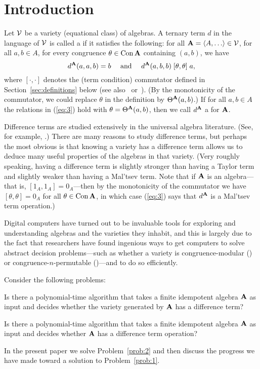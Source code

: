 

\section{Introduction}
\label{sec:introduction}
Let $\mathcal{V}$ be a variety (equational class) of algebras.
A ternary term $d$ in the language of $\mathcal{V}$ is called
a  if it satisfies the following:
for all $\bA = \<A, \dots \> \in \sV$, for all $a, b \in A$, for every
congruence $\theta\in \operatorname{Con}\mathbf{A}$ containing $(a,b)$, we have
\begin{equation}
\label{eq:3}
d^{\mathbf{A}}(a,a,b) = b \quad \text{ and } \quad
d^{\mathbf{A}}(a,b,b) \mathrel{[\theta, \theta]} a,
\end{equation}
where $[\cdot, \cdot]$ denotes the (term condition) commutator
defined in Section~\ref{sec:definitions} below
(see also~\cite{HM:1988} or~\cite{MR3076179}).
(By the monotonicity of the commutator, we could replace $\theta$ in the
definition by $\Theta^{\mathbf{A}}(a,b)$.)
If for all $a, b \in A$ the relations in (\ref{eq:3}) hold
with $\theta = \Theta^{\mathbf{A}}(a,b)$, then we call
$d^{\mathbf{A}}$ a  for $\mathbf{A}$.

Difference terms are studied extensively in the universal algebra literature.
(See, for example, \cite{HM:1988,KSW,MR3449235,MR1358491,MR3076179,MR1663558}.)
There are many reasons to study difference terms, but
perhaps the most obvious is that knowing a variety
has a difference term allows us to deduce many useful
properties of the algebras in that variety.
(Very roughly speaking, having a difference term is slightly stronger than having
a Taylor term and slightly weaker than having a Mal'tsev term.
Note that if
$\mathbf{A}$ is an  algebra---that is, $[1_A, 1_A] = 0_A$---then by
the monotonicity of the commutator we have
$[\theta, \theta] = 0_A$ for all $\theta \in \operatorname{Con} \mathbf{A}$, in which case
(\ref{eq:3}) says that $d^{\mathbf{A}}$ is a Mal'tsev term operation.)

Digital computers have turned out to be invaluable tools for exploring and
understanding algebras and the varieties they inhabit, and this is largely due
to the fact that researchers have found ingenious ways
to get computers to solve abstract decision problems---such as
whether a variety is
congruence-modular (\cite{Freese:2009}) or
congruence-$n$-permutable (\cite{MR3239624})---and to do so efficiently.

Consider the following problems:
\begin{prob}
  \label{prob:1}
  Is there a polynomial-time algorithm that takes a finite
  idempotent algebra $\mathbf{A}$ as input and decides whether the variety generated by
  $\mathbf{A}$ has a difference term?
\end{prob}
\begin{prob}
  \label{prob:2}
  Is there a polynomial-time algorithm that takes a finite
  idempotent algebra $\mathbf{A}$ as input and decides whether
  $\mathbf{A}$ has a difference term operation?
\end{prob}
In the present paper we solve Problem~\ref{prob:2} and then discuss the
progress we have made toward a solution to Problem~\ref{prob:1}.

